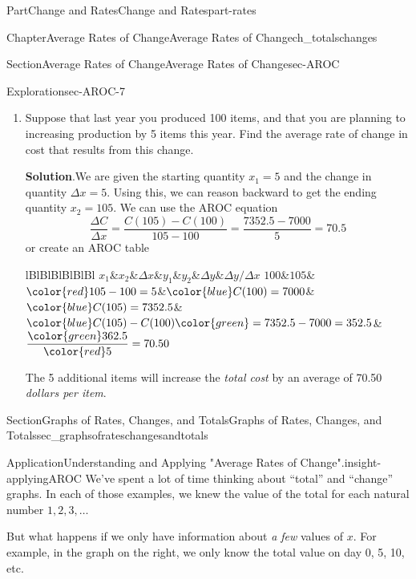 \documentclass{tufte-book}
\newcommand{\blocktitlefont}{\relax}
\newcommand{\tabularfont}{\relax}
\numberwithin{equation}{chapter}
\newcommand{\hrulemedium}{\noalign{\hrule height 0.07em}}
\begin{document}
\begin{partptx}{Part}{Change and Rates}{}{Change and Rates}{}{}{part-rates}
\begin{chapterptx}{Chapter}{Average Rates of Change}{}{Average Rates of Change}{}{}{ch_totalschanges}
\begin{sectionptx}{Section}{Average Rates of Change}{}{Average Rates of Change}{}{}{sec-AROC}
\begin{exploration}{Exploration}{}{sec-AROC-7}
\begin{enumerate}[font=\bfseries,label=(\alph*),ref=\alph*]
\begin{center}
{}%
\end{center}%
%
\item{}Suppose that last year you produced 100 items, and that you are planning to increasing production by 5 items this year. Find the average rate of change in cost that results from this change.%
\par\smallskip%
\noindent\textbf{\blocktitlefont Solution}.\hypertarget{sec-AROC-7-4-2}{}\quad{}We are given the starting quantity \(x_1 = 5\) and the change in quantity \(\Delta x = 5\).  Using this, we can reason backward to get the ending quantity \(x_2 = 105\). We can use the AROC equation%
\begin{equation*}
\dfrac{\Delta C}{\Delta x} = \dfrac{C(105) - C(100)}{105-100} = \dfrac{7352.5 - 7000}{5} = 70.5
\end{equation*}
or create an AROC table \begin{center}%
{\tabularfont%
\begin{tabular}{lBlBlBlBlBlBl}
\(x_1\)&\(x_2\)&\(\Delta x\)&\(y_1\)&\(y_2\)&\(\Delta y\)&\(\Delta y/\Delta x\)\tabularnewline\hrulemedium
\(100\)&\(105\)&\(\color{red} 	105 - 100 = 5\)&\(\color{blue} C(100) = 7000\)&\(\color{blue} C(105) = 7352.5\)&\(\color{blue} C(105) - C(100) \color{green} =  7352.5 - 7000 = 352.5\)&\(\dfrac{\color{green} 362.5}{\color{red} 5} =  70.50 \)
\end{tabular}
}%
\end{center}%
 The 5 additional items will increase the \emph{total cost} by an average of 70.50 \emph{dollars per item}.%
\end{enumerate}%
\end{exploration}%
\end{sectionptx}
%
%
\typeout{************************************************}
\typeout{************************************************}
%
\begin{sectionptx}{Section}{Graphs of Rates, Changes, and Totals}{}{Graphs of Rates, Changes, and Totals}{}{}{sec_graphsofrateschangesandtotals}
\begin{insight}{Application}{Understanding and Applying "Average Rates of Change".}{insight-applyingAROC}%
We've spent a lot of time thinking about ``total'' and ``change'' graphs. In each of those examples, we knew the value of the total for each natural number \(1,2,3,\dots\)%
\par
But what happens if we only have information about \emph{a few} values of \(x\). For example, in the graph on the right, we only know the total value on day 0, 5, 10, etc.%

\end{insight}
\end{sectionptx}
\end{chapterptx}
\end{partptx}
\end{document}
